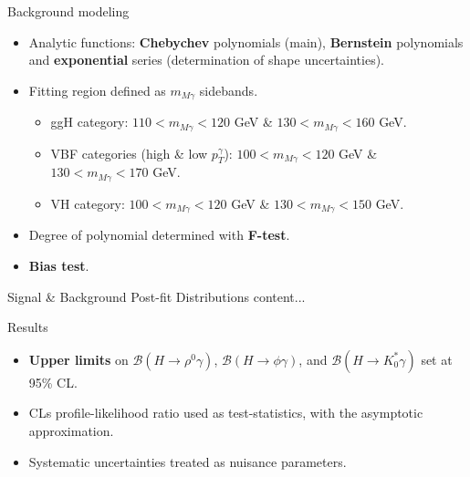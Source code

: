 \documentclass[9pt,aspectratio=1610]{beamer}
\newcommand{\khl}[1]{\textbf{\color{structure}#1}}
\begin{document}
\begin{frame}{Background modeling}
	\begin{itemize}
		\item Analytic functions: \textbf{Chebychev} polynomials (main), \textbf{Bernstein} polynomials and \textbf{exponential} series (determination of shape uncertainties).
		\item Fitting region defined as \(m_{M\gamma}\) sidebands.\\
		\begin{itemize}
			\item ggH category: \(110 < m_{M\gamma} < 120\) GeV \& \(130 < m_{M\gamma} < 160\) GeV. 
			\item VBF categories (high \& low \(p^\gamma_T\)): \(100 < m_{M\gamma} < 120\) GeV \& \(130 < m_{M\gamma} < 170\) GeV.
			\item VH category: \(100 < m_{M\gamma} < 120\) GeV \& \(130 < m_{M\gamma} < 150\) GeV.
		\end{itemize}
		\item Degree of polynomial determined with \textbf{F-test}.
		\item \textbf{Bias test}.
	\end{itemize}
\end{frame}

\begin{frame}{Signal \& Background Post-fit Distributions}
	content...
\end{frame}

\begin{frame}{Results}
	\begin{itemize}
		\item \khl{Upper limits} on $\mathcal{B}(H\rightarrow\rho^0\gamma)$, $\mathcal{B}(H\rightarrow\phi\gamma)$, and $\mathcal{B}(H\rightarrow K^*_0\gamma)$ set at 95\% CL.
		\item CLs profile-likelihood ratio used as test-statistics, with the asymptotic approximation.
		\item Systematic uncertainties treated as nuisance parameters. 
	\end{itemize}
\end{frame}
\end{document}
